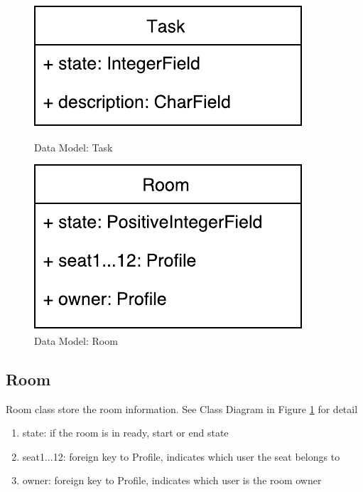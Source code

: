 \documentclass[11pt]{article}
\begin{document}
\begin{figure}
\centering
\begin{minipage}{.5\linewidth}
\centering
\includegraphics[width=0.7\linewidth, keepaspectratio]{model-task.pdf}
\caption{Data Model: Task}
\label{fig:model-task}
\end{minipage}%
\begin{minipage}{.5\linewidth}
\centering
\includegraphics[width=0.7\linewidth, keepaspectratio]{model-room.pdf}
\caption{Data Model: Room}
\label{fig:model-room}
\end{minipage}
\end{figure}

\subsection{Room}
Room class store the room information. See Class Diagram in Figure \ref{fig:model-room} for detail
\begin{enumerate}
\item
state: if the room is in ready, start or end state
\item
seat1...12: foreign key to Profile, indicates which user the seat belongs to
\item
owner: foreign key to Profile, indicates which user is the room owner
\end{enumerate}



\end{document}
